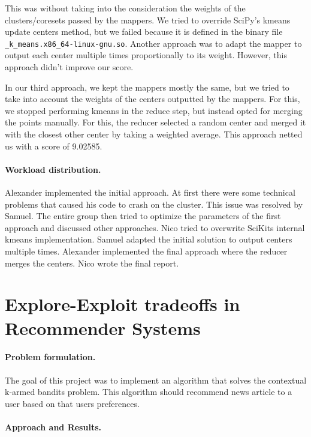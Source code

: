 \documentclass[a4paper,11pt]{article}
\begin{document}
This was without taking into the consideration the weights of the clusters/coresets passed by the mappers. We tried to override SciPy's kmeans update centers method, but we failed because it is defined in the binary file \verb|_k_means.x86_64-linux-gnu.so|. Another approach was to adapt the mapper to output each center multiple times proportionally to its weight. However, this approach didn't improve our score.

In our third approach, we kept the mappers mostly the same, but we tried to take into account the weights of the centers outputted by the mappers. For this, we stopped performing kmeans in the reduce step, but instead opted for merging the points manually. For this, the reducer selected a random center and merged it with the closest other center by taking a weighted average.
This approach netted us with a score of 9.02585.


\paragraph{Workload distribution.\!\!\!}

Alexander implemented the initial approach. At first there were some technical problems that caused his code to crash on the cluster. This issue was
resolved by Samuel. The entire group then tried to optimize the parameters of the first approach and discussed other approaches. Nico tried to overwrite 
SciKits internal kmeans implementation. Samuel adapted the initial solution to output centers multiple times. 
Alexander implemented the final approach where the reducer merges the centers. Nico wrote the final report.



\newpage
\section{Explore-Exploit tradeoffs in Recommender Systems} 

\paragraph{Problem formulation.\!\!\!}
The goal of this project was to implement an algorithm that solves the contextual k-armed bandits problem. 
This algorithm should recommend news article to a user based on that users preferences.

\paragraph{Approach and Results.\!\!\!}
\end{document}
